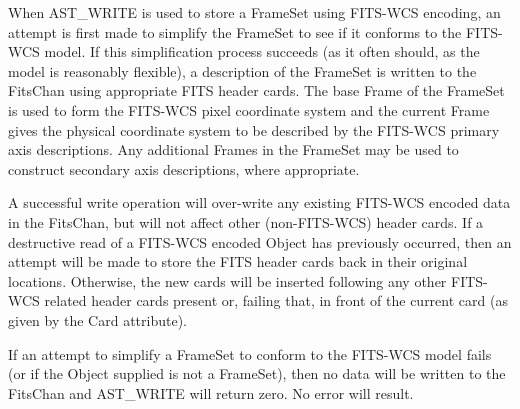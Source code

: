 \documentclass[twoside,11pt]{article}
\begin{document}
{{      When AST\_WRITE is used to store a FrameSet using FITS-WCS
      encoding, an attempt is first made to simplify the FrameSet to
      see if it conforms to the FITS-WCS model. If this simplification
      process succeeds (as it often should, as the model is reasonably
      flexible), a description of the FrameSet is written to the
      FitsChan using appropriate FITS header cards. The base Frame of
      the FrameSet is used to form the FITS-WCS pixel coordinate
      system and the current Frame gives the physical coordinate
      system to be described by the FITS-WCS primary axis
      descriptions.  Any additional Frames in the FrameSet may be used
      to construct secondary axis descriptions, where appropriate.

      A successful write operation will over-write any existing
      FITS-WCS encoded data in the FitsChan, but will not affect other
      (non-FITS-WCS) header cards. If a destructive read of a FITS-WCS
      encoded Object has previously occurred, then an attempt will be
      made to store the FITS header cards back in their original
      locations. Otherwise, the new cards will be inserted following
      any other FITS-WCS related header cards present or, failing
      that, in front of the current card (as given by the Card
      attribute).

      If an attempt to simplify a FrameSet to conform to the FITS-WCS
      model fails (or if the Object supplied is not a FrameSet), then
      no data will be written to the FitsChan and AST\_WRITE will
      return zero. No error will result.
   }
   }
\end{document}
